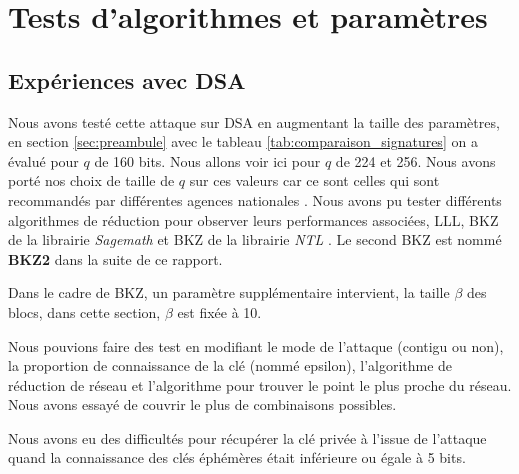 \documentclass{backend}
\begin{document}
%
%

\newpage

\section{Tests d'algorithmes et paramètres} \label{sec:epreuves}

\subsection{Expériences avec DSA}

Nous avons testé cette attaque sur DSA en augmentant la taille des paramètres, en section \ref{sec:preambule} avec le tableau \ref{tab:comparaison_signatures} on a évalué pour $q$ de 160 bits. Nous allons voir ici pour $q$ de 224 et 256. Nous avons porté nos choix de taille de $q$ sur ces valeurs car ce sont celles qui sont recommandés par différentes agences nationales \cite{NIST_ECDSA}.\smallbreak
Nous avons pu tester différents algorithmes de réduction pour observer leurs performances associées, LLL, BKZ de la librairie \textit{Sagemath} et BKZ de la librairie \textit{NTL} \cite{NTL}. Le second BKZ est nommé \textbf{BKZ2} dans la suite de ce rapport.\smallbreak

Dans le cadre de BKZ, un paramètre supplémentaire intervient, la taille $\beta$ des blocs, dans cette section, $\beta$ est fixée à 10. 

Nous pouvions faire des test en modifiant le mode de l'attaque (contigu ou non), la proportion de connaissance de la clé (nommé epsilon), l'algorithme de réduction de réseau et l'algorithme pour trouver le point le plus proche du réseau. Nous avons essayé de couvrir le plus de combinaisons possibles.\smallbreak



Nous avons eu des difficultés pour récupérer la clé privée à l'issue de l'attaque quand la connaissance des clés éphémères était inférieure ou égale à 5 bits. 
\end{document}
